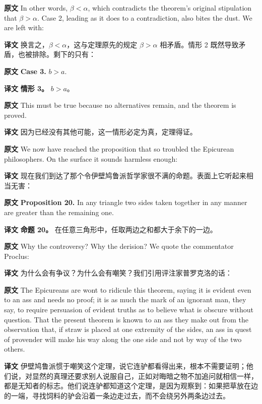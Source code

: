 \documentclass[UTF8,zihao=-4]{ctexart}
\newcommand{\BodyFont}{\fontsize{10.5pt}{15.5pt}\selectfont}
\renewenvironment{quote}{\par\noindent\begingroup\BodyFont}{\par\endgroup}
\begin{document}
\noindent\textbf{原文} In other words, $\beta<\alpha$, which contradicts the theorem's original stipulation that $\beta>\alpha$. Case 2, leading as it does to a contradiction, also bites the dust. We are left with:

\noindent\textbf{译文} 换言之，$\beta<\alpha$，这与定理原先的规定 $\beta>\alpha$ 相矛盾。情形 2 既然导致矛盾，也被排除。剩下的只有：

\noindent\textbf{原文} \textbf{Case 3.} $b>a$.

\noindent\textbf{译文} \textbf{情形 3。} $b>a$。

\noindent\textbf{原文} This must be true because no alternatives remain, and the theorem is proved.

\noindent\textbf{译文} 因为已经没有其他可能，这一情形必定为真，定理得证。

\noindent\textbf{原文} We now have reached the proposition that so troubled the Epicurean philosophers. On the surface it sounds harmless enough:

\noindent\textbf{译文} 现在我们到达了那个令伊壁鸠鲁派哲学家很不满的命题。表面上它听起来相当无害：

\noindent\textbf{原文} \textbf{Proposition 20.} In any triangle two sides taken together in any manner are greater than the remaining one.

\noindent\textbf{译文} \textbf{命题 20。} 在任意三角形中，任取两边之和都大于余下的一边。

\noindent\textbf{原文} Why the controversy? Why the derision? We quote the commentator Proclus:

\noindent\textbf{译文} 为什么会有争议？为什么会有嘲笑？我们引用评注家普罗克洛的话：

\begin{quote}
\noindent\textbf{原文} The Epicureans are wont to ridicule this theorem, saying it is evident even to an ass and needs no proof; it is as much the mark of an ignorant man, they say, to require persuasion of evident truths as to believe what is obscure without question. That the present theorem is known to an ass they make out from the observation that, if straw is placed at one extremity of the sides, an ass in quest of provender will make his way along the one side and not by way of the two others.

\noindent\textbf{译文} 伊壁鸠鲁派惯于嘲笑这个定理，说它连驴都看得出来，根本不需要证明；他们说，对显然的真理还要求别人说服自己，正如对晦暗之物不加追问就相信一样，都是无知者的标志。他们说连驴都知道这个定理，是因为观察到：如果把草放在边的一端，寻找饲料的驴会沿着一条边走过去，而不会绕另外两条边过去。
\end{quote}
\end{document}
